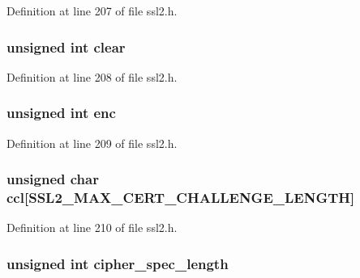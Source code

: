 Definition at line 207 of file ssl2.\+h.

\subsubsection[{\texorpdfstring{clear}{clear}}]{\setlength{\rightskip}{0pt plus 5cm}unsigned int clear}\hypertarget{structssl2__state__st_a9446900a3977792359b655add6754a1f}{}\label{structssl2__state__st_a9446900a3977792359b655add6754a1f}


Definition at line 208 of file ssl2.\+h.

\subsubsection[{\texorpdfstring{enc}{enc}}]{\setlength{\rightskip}{0pt plus 5cm}unsigned int enc}\hypertarget{structssl2__state__st_a351b336dde67c7824f93553242992db7}{}\label{structssl2__state__st_a351b336dde67c7824f93553242992db7}


Definition at line 209 of file ssl2.\+h.

\subsubsection[{\texorpdfstring{ccl}{ccl}}]{\setlength{\rightskip}{0pt plus 5cm}unsigned char ccl\mbox{[}{\bf S\+S\+L2\+\_\+\+M\+A\+X\+\_\+\+C\+E\+R\+T\+\_\+\+C\+H\+A\+L\+L\+E\+N\+G\+E\+\_\+\+L\+E\+N\+G\+TH}\mbox{]}}\hypertarget{structssl2__state__st_a6bfe609d1289aa450650310810938b33}{}\label{structssl2__state__st_a6bfe609d1289aa450650310810938b33}


Definition at line 210 of file ssl2.\+h.

\subsubsection[{\texorpdfstring{cipher\+\_\+spec\+\_\+length}{cipher_spec_length}}]{\setlength{\rightskip}{0pt plus 5cm}unsigned int cipher\+\_\+spec\+\_\+length}\hypertarget{structssl2__state__st_aeb38423853460bf1c28f72ddd06a54b3}{}\label{structssl2__state__st_aeb38423853460bf1c28f72ddd06a54b3}


